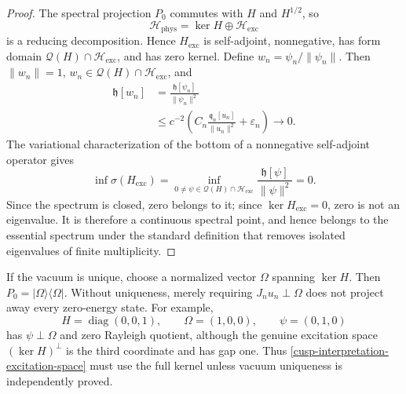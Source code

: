 \begin{proof}
The spectral projection \(P_0\) commutes with \(H\) and \(H^{1/2}\), so
\[
 \mathcal H_{\mathrm{phys}}
 =\ker H\oplus\mathcal H_{\mathrm{exc}}
\]
is a reducing decomposition.  Hence \(H_{\mathrm{exc}}\) is self-adjoint,
nonnegative, has form domain
\(\mathcal Q(H)\cap\mathcal H_{\mathrm{exc}}\), and has zero kernel.
Define \(w_n=\psi_n/\lVert\psi_n\rVert\).  Then
\(\lVert w_n\rVert=1\),
\(w_n\in\mathcal Q(H)\cap\mathcal H_{\mathrm{exc}}\), and
\begin{align*}
 \mathfrak h[w_n]
 &=\frac{\mathfrak h[\psi_n]}{\lVert\psi_n\rVert^2}\\
 &\le c^{-2}\left(
 C_n\frac{\mathfrak q_n[u_n]}{\lVert u_n\rVert^2}
 +\varepsilon_n\right)\longrightarrow0.
\end{align*}
The variational characterization of the bottom of a nonnegative
self-adjoint operator gives
\[
 \inf\sigma(H_{\mathrm{exc}})
 =\inf_{0\ne\psi\in
 \mathcal Q(H)\cap\mathcal H_{\mathrm{exc}}}
 \frac{\mathfrak h[\psi]}{\lVert\psi\rVert^2}=0.
\]
Since the spectrum is closed, zero belongs to it; since
\(\ker H_{\mathrm{exc}}=0\), zero is not an eigenvalue.  It is therefore a
continuous spectral point, and hence belongs to the essential spectrum under
the standard definition that removes isolated eigenvalues of finite
multiplicity.
\end{proof}

\begin{remark}
If the vacuum is unique, choose a normalized vector
\(\Omega\) spanning \(\ker H\).  Then
\(P_0=|\Omega\rangle\langle\Omega|\).  Without uniqueness, merely requiring
\(J_nu_n\perp\Omega\) does not project away every zero-energy state.  For
example,
\[
 H=\operatorname{diag}(0,0,1),\qquad
 \Omega=(1,0,0),\qquad \psi=(0,1,0)
\]
has \(\psi\perp\Omega\) and zero Rayleigh quotient, although the genuine
excitation space \((\ker H)^\perp\) is the third coordinate and has gap one.
Thus \cref{cusp-interpretation-excitation-space} must use the full kernel
unless vacuum uniqueness is independently proved.
\end{remark}

